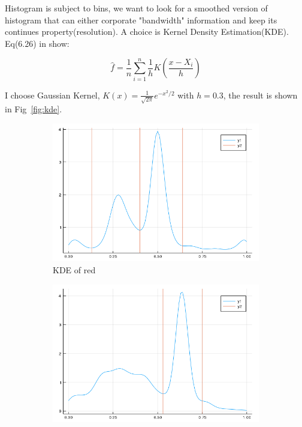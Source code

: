 \documentclass{beamer}
\begin{document}
\begin{frame}
  Histogram is subject to bins, we want to look for a smoothed version of histogram 
  that can either corporate "bandwidth" information and keep its continues property(resolution). 
  A choice is Kernel Density Estimation(KDE). Eq(6.26) in \cite{wasserman2006all} show:
  
  $$
  \hat{f} = \frac{1}{n} \sum_{i=1}^n \frac{1}{h} K\left( \frac{x-X_i}{h} \right)
  $$
  
  I choose Gaussian Kernel, $K(x)=\frac{1}{\sqrt{2\pi}}e^{-x^2/2}$ with $h=0.3$, 
  the result is shown in Fig~\ref{fig:kde}.
  
  \begin{figure}[htb]
    \centering
    \begin{subfigure}[b]{0.24\linewidth}
      \includegraphics[width=\linewidth]{images/kde_r.png}
      \caption{KDE of red}
    \end{subfigure}
    \begin{subfigure}[b]{0.24\linewidth}
      \includegraphics[width=\linewidth]{images/kde_g.png}

\end{subfigure}
\end{figure}
\end{frame}
\end{document}

